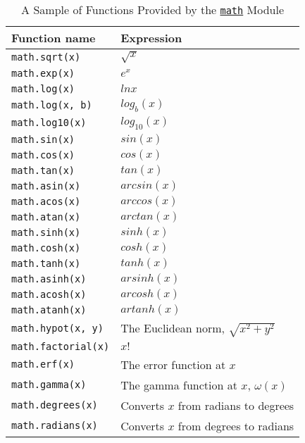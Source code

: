 \documentclass[a4paper,11pt]{book}
\numberwithin{figure}{chapter}
\numberwithin{table}{chapter}
\begin{document}
\begin{table}[!htbp]
	\centering
	\caption{A Sample of Functions Provided by the \href{https://docs.python.org/3/library/math.html}{\texttt{math}} Module}
	\label{tab:math_module_functions}
	\begin{tabular}{ll}
		\toprule \toprule
		Function name &  Expression \\
		\midrule
		\texttt{math.sqrt(x)} & $\sqrt{x}$ \\
		\texttt{math.exp(x)} & $e^{x}$ \\
		\texttt{math.log(x)} & $ln{x}$ \\
		\texttt{math.log(x, b)} & $log_{b}(x)$ \\
		\texttt{math.log10(x)} & $log_{10}(x)$ \\
		\texttt{math.sin(x)} & $sin(x)$ \\
		\texttt{math.cos(x)} & $cos(x)$ \\
		\texttt{math.tan(x)} & $tan(x)$ \\
		\texttt{math.asin(x)} & $arcsin(x)$ \\
		\texttt{math.acos(x)} & $arccos(x)$ \\
		\texttt{math.atan(x)} & $arctan(x)$ \\
		\texttt{math.sinh(x)} & $sinh(x)$ \\
		\texttt{math.cosh(x)} & $cosh(x)$ \\
		\texttt{math.tanh(x)} & $tanh(x)$ \\
		\texttt{math.asinh(x)} & $arsinh(x)$ \\
		\texttt{math.acosh(x)} & $arcosh(x)$ \\
		\texttt{math.atanh(x)} & $artanh(x)$ \\
		\texttt{math.hypot(x, y)} & The Euclidean norm, $\sqrt{x^{2} + y^{2}}$ \\
		\texttt{math.factorial(x)} & $x!$ \\
		\texttt{math.erf(x)} & The error function at $x$ \\
		\texttt{math.gamma(x)} & The gamma function at $x$, $\omega(x)$ \\
		\texttt{math.degrees(x)} & Converts $x$ from radians to degrees \\
		\texttt{math.radians(x)} & Converts $x$ from degrees to radians\\
		\bottomrule 
	\end{tabular}
\end{table}
\clearpage
\end{document}
